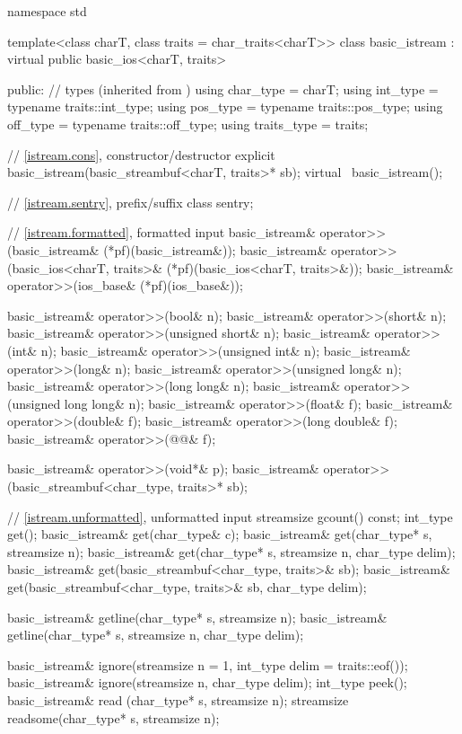 %
\begin{codeblock}
namespace std {
  template<class charT, class traits = char_traits<charT>>
  class basic_istream : virtual public basic_ios<charT, traits> {
  public:
    // types (inherited from )
    using char_type   = charT;
    using int_type    = typename traits::int_type;
    using pos_type    = typename traits::pos_type;
    using off_type    = typename traits::off_type;
    using traits_type = traits;

    // \ref{istream.cons}, constructor/destructor
    explicit basic_istream(basic_streambuf<charT, traits>* sb);
    virtual ~basic_istream();

    // \ref{istream.sentry}, prefix/suffix
    class sentry;

    // \ref{istream.formatted}, formatted input
    basic_istream& operator>>(basic_istream& (*pf)(basic_istream&));
    basic_istream& operator>>(basic_ios<charT, traits>& (*pf)(basic_ios<charT, traits>&));
    basic_istream& operator>>(ios_base& (*pf)(ios_base&));

    basic_istream& operator>>(bool& n);
    basic_istream& operator>>(short& n);
    basic_istream& operator>>(unsigned short& n);
    basic_istream& operator>>(int& n);
    basic_istream& operator>>(unsigned int& n);
    basic_istream& operator>>(long& n);
    basic_istream& operator>>(unsigned long& n);
    basic_istream& operator>>(long long& n);
    basic_istream& operator>>(unsigned long long& n);
    basic_istream& operator>>(float& f);
    basic_istream& operator>>(double& f);
    basic_istream& operator>>(long double& f);
    basic_istream& operator>>(@@& f);

    basic_istream& operator>>(void*& p);
    basic_istream& operator>>(basic_streambuf<char_type, traits>* sb);

    // \ref{istream.unformatted}, unformatted input
    streamsize gcount() const;
    int_type get();
    basic_istream& get(char_type& c);
    basic_istream& get(char_type* s, streamsize n);
    basic_istream& get(char_type* s, streamsize n, char_type delim);
    basic_istream& get(basic_streambuf<char_type, traits>& sb);
    basic_istream& get(basic_streambuf<char_type, traits>& sb, char_type delim);

    basic_istream& getline(char_type* s, streamsize n);
    basic_istream& getline(char_type* s, streamsize n, char_type delim);

    basic_istream& ignore(streamsize n = 1, int_type delim = traits::eof());
    basic_istream& ignore(streamsize n, char_type delim);
    int_type       peek();
    basic_istream& read    (char_type* s, streamsize n);
    streamsize     readsome(char_type* s, streamsize n);

}}
\end{codeblock}
